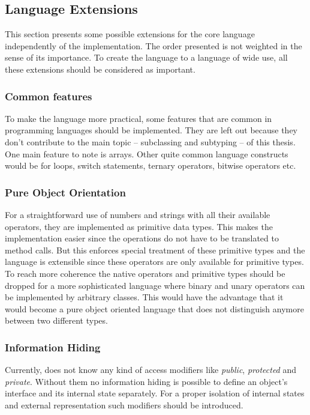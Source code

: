 \subsection{Language Extensions}
This section presents some possible extensions for the core language
independently of the implementation. The order presented is not weighted
in the sense of its importance. To create the language to a language
of wide use, all these extensions should be considered as important.

\subsubsection{Common features}
To make the language more practical, some features that are common
in programming languages should be implemented. They are left out
because they don't contribute to the main topic -- subclassing and subtyping --
of this thesis.
One main feature to note is arrays. Other quite common language constructs
would be for loops, switch statements, ternary operators, bitwise operators
etc.

\subsubsection{Pure Object Orientation}
For a straightforward use of numbers and strings with all their available
operators, they are implemented as primitive data types. This makes the
implementation easier since the operations do not have to be translated
to method calls. But this enforces special treatment of these primitive types
and the language is extensible since these operators are only available for primitive
types. To reach more coherence the native operators and primitive types should
be dropped for a more sophisticated language where binary and unary operators can be
implemented by arbitrary classes. This would have the advantage that it
would become a pure object oriented language that does not distinguish anymore
between two different types.

\subsubsection{Information Hiding}
Currently, \ooplss does not know any kind of access modifiers like
\emph{public}, \emph{protected} and \emph{private}. Without them no
information hiding is possible to define an object's interface
and its internal state separately. For a proper isolation of
internal states and external representation such modifiers should be
introduced.

